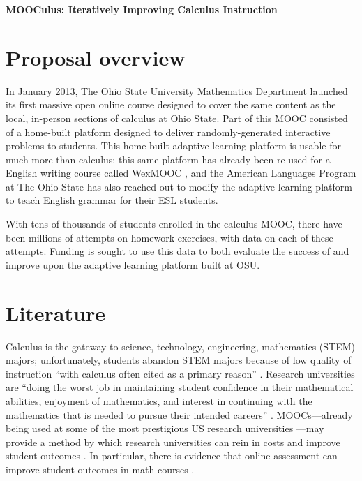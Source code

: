 \documentclass[12pt]{article}
\begin{document}
\begin{center}
  \textbf{MOOCulus: Iteratively Improving Calculus Instruction}
\end{center}

% 

\section{Proposal overview}

In January 2013, The Ohio State University Mathematics Department
launched its first massive open online course designed to cover the
same content as the local, in-person sections of calculus at Ohio
State.  Part of this MOOC consisted of a home-built platform designed
to deliver randomly-generated interactive problems to students.  This
home-built adaptive learning platform is usable for much more than
calculus: this same platform has already been re-used for a English
writing course called WexMOOC \parencite{gates-foundation-grant}, and
the American Languages Program at The Ohio State has also reached out
to modify the adaptive learning platform to teach English grammar for
their ESL students.

With tens of thousands of students enrolled in the calculus MOOC,
there have been millions of attempts on homework exercises, with data
on each of these attempts.  Funding is sought to use this data to both
evaluate the success of and improve upon the adaptive learning
platform built at OSU.

\section{Literature}

Calculus is the gateway to science, technology, engineering,
mathematics (STEM) majors; unfortunately, students abandon STEM majors
because of low quality of instruction ``with calculus often cited as a
primary reason'' \parencite{calculus-programs}.  Research universities
are ``doing the worst job in maintaining student confidence in their
mathematical abilities, enjoyment of mathematics, and interest in
continuing with the mathematics that is needed to pursue their
intended careers'' \parencite{calculus-students}.  MOOCs---already
being used at some of the most prestigious US research
universities \parencite{morris2013moocs}---may provide a method by
which research universities can rein in costs and improve student
outcomes \parencite{bowen2013higher}.  In particular, there is
evidence that online assessment can improve student outcomes in math
courses \parencite{angus2009does}.
\end{document}
